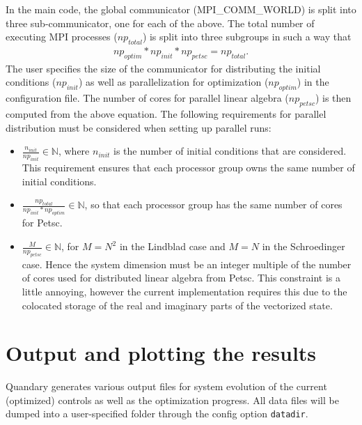 \documentclass[11pt]{article}
\begin{document}
    In the main code, the global communicator (MPI\_COMM\_WORLD) is split into
    three sub-communicator, one for each of the above. The total number of executing MPI
    processes ($np_{total}$) is split into three subgroups in such a way that 
    \begin{align*}
      np_{optim} * np_{init} * np_{petsc} = np_{total}.
    \end{align*}
    The user specifies the size of the communicator for distributing the
    initial conditions ($np_{init}$) as well as parallelization for optimization
    ($np_{optim}$) in the configuration file. The number of cores for parallel linear
    algebra ($np_{petsc}$) is then computed from the above equation. The
    following requirements for parallel distribution must be considered when
    setting up parallel runs:
    \begin{itemize}
    \item $\frac{n_{init}}{np_{init}} \in \mathds{N}$, where $n_{init}$ is
      the number of initial conditions that are considered. This requirement
      ensures that each processor group owns the same number of initial
      conditions.
    \item $\frac{np_{total}}{np_{init}*np_{optim}} \in \mathds{N}$, so that
      each processor group has the same number of cores for Petsc.
    \item $\frac{M}{np_{petsc}} \in \mathds{N}$, for $M=N^2$ in the Lindblad case and $M=N$ in the Schroedinger case. Hence the system dimension must be an integer multiple of the number of cores used for
      distributed linear algebra from Petsc. This constraint is a little
      annoying, however the current implementation requires this due to the
      colocated storage of the real and imaginary parts of the vectorized
      state.
    \end{itemize}
 
\section{Output and plotting the results}
Quandary generates various output files for system evolution of the current (optimized) controls as well as the optimization progress. All data files will be dumped into a user-specified folder through the config option \texttt{datadir}. 
\end{document}
